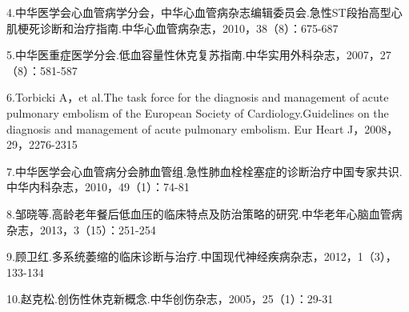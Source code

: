 4.中华医学会心血管病学分会，中华心血管病杂志编辑委员会.急性ST段抬高型心肌梗死诊断和治疗指南.中华心血管病杂志，2010，38（8）：675-687

5.中华医重症医学分会.低血容量性休克复苏指南.中华实用外科杂志，2007，27（8）：581-587

6.Torbicki A，et al.The task force for the diagnosis and management of
acute pulmonary embolism of the European Society of
Cardiology.Guidelines on the diagnosis and management of acute pulmonary
embolism. Eur Heart J，2008，29，2276-2315

7.中华医学会心血管病分会肺血管组.急性肺血栓栓塞症的诊断治疗中国专家共识.中华内科杂志，2010，49（1）：74-81

8.邹晓等.高龄老年餐后低血压的临床特点及防治策略的研究.中华老年心脑血管病杂志，2013，3（15）：251-254

9.顾卫红.多系统萎缩的临床诊断与治疗.中国现代神经疾病杂志，2012，1（3），133-134

10.赵克松.创伤性休克新概念.中华创伤杂志，2005，25（1）：29-31

\protect\hypertarget{text00118.html}{}{}

